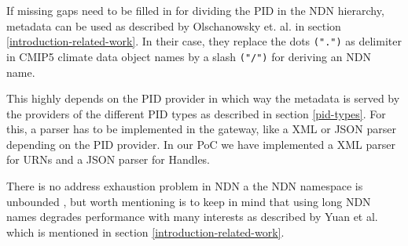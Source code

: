 If missing gaps need to be filled in for dividing the PID in the NDN hierarchy, 
metadata can be used as described by Olschanowsky et. al. \cite{ndn-clim} in section \ref{introduction-related-work}. In their case, they replace the dots \texttt{(".")} as delimiter in CMIP5 climate data object names by a slash \texttt{("/")} for deriving an NDN name. 

This highly depends on the PID provider in which way the metadata is served by the providers of the different PID types as 
described in section \ref{pid-types}. For this, a parser has to be implemented in the gateway, like a XML or JSON parser depending on the PID provider. In our PoC we have implemented a XML parser for URNs and a JSON parser for Handles.

There is no address exhaustion problem in NDN a the NDN namespace is unbounded \cite{ndn-nspace}, but worth mentioning is to keep in mind that using long NDN names degrades performance with many interests as described by Yuan et al. \cite{yuan2012scalable} 
which is mentioned in section \ref{introduction-related-work}.







